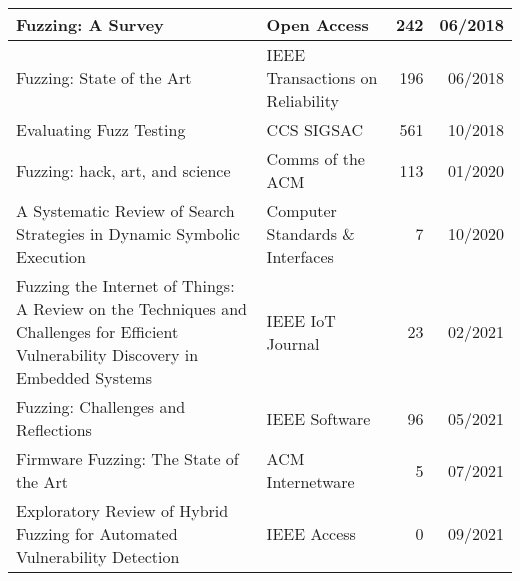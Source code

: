 \documentclass{article}
\begin{document}
\begin{longtable}{|P{0.44\textwidth}|P{0.32\textwidth}|r|r|}
    Fuzzing: A Survey\cite{FuzzingASurvey}                                                                                                        & Open Access                                                & 242            & 06/2018       \\\hline
    Fuzzing: State of the Art\cite{FuzzingStateOfTheArt2018}                                                                                      & IEEE Transactions on Reliability                           & 196            & 06/2018       \\\hline
    Evaluating Fuzz Testing\cite{EvaluatingFuzzTesting}                                                                                           & CCS SIGSAC                                                 & 561            & 10/2018       \\\hline
    Fuzzing: hack, art, and science\cite{HackArtScience}                                                                                          & Comms of the ACM                                           & 113            & 01/2020       \\\hline
    A Systematic Review of Search Strategies in Dynamic Symbolic Execution\cite{SearchStrategies}                                                 & Computer Standards \& Interfaces                           & 7              & 10/2020       \\\hline
    Fuzzing the Internet of Things: A Review on the Techniques and Challenges for Efficient Vulnerability Discovery in Embedded Systems\cite{IoT} & IEEE IoT Journal                                           & 23             & 02/2021       \\\hline
    Fuzzing: Challenges and Reflections\cite{ChallengesAndReflections}                                                                            & IEEE Software                                              & 96             & 05/2021       \\\hline
    Firmware Fuzzing: The State of the Art\cite{Firmware}                                                                                         & ACM Internetware                                           & 5              & 07/2021       \\\hline
    Exploratory Review of Hybrid Fuzzing for Automated Vulnerability Detection                                                                    & IEEE Access                                                & 0              & 09/2021       \\\hline

\end{longtable}
\end{document}
